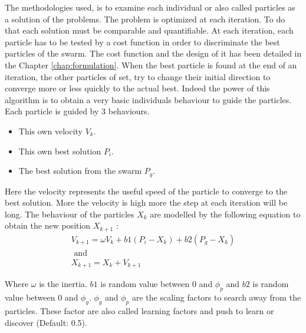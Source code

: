 The methodologies used, is to examine each individual or also called particles as a solution of the problems. The problem is optimized at each iteration. To do that each solution must be comparable and quantifiable. At each iteration, each particle has to be tested by a cost function in order to discriminate the best particles of the swarm. The cost function and the design of it has been detailed in the Chapter \ref{chap:formulation}.
When the best particle is found at the end of an iteration, the other particles of set, try to change their initial direction to converge more or less quickly to the actual best. 
Indeed the power of this algorithm is to obtain a very basic individuals behaviour to guide the particles. 
Each particle is guided by 3 behaviours.
 \begin{itemize}
 \item  This own velocity $V_k$. 
 \item  This own best solution $P_i$.
 \item  The best solution from the swarm $P_g$.
\end{itemize}  
Here the velocity represents the useful speed of the particle to converge to the best solution. More the velocity is high more the step at each iteration will be long. 
The behaviour of the particles $X_k$ are modelled by the following equation to obtain the new position $X_{k+1}$ :
\begin{equation} \label{eq:PSO}
\begin{split}
 V_{k+1}= \omega V_k +b1(P_i -X_k)+b2(P_g-X_k)
\\
\mbox{ and } \\ X_{k+1}=X_k+V_{k+1}
\end{split}
\end{equation}

Where $\omega$ is the inertia. $b1$ is random value between 0 and $\phi_p$ and $b2$ is random value between 0 and $\phi_g$. $\phi_g$ and $\phi_p$  are the scaling factors to search away from the particles. These factor are also called learning factors and push to learn or discover  (Default: 0.5). 

